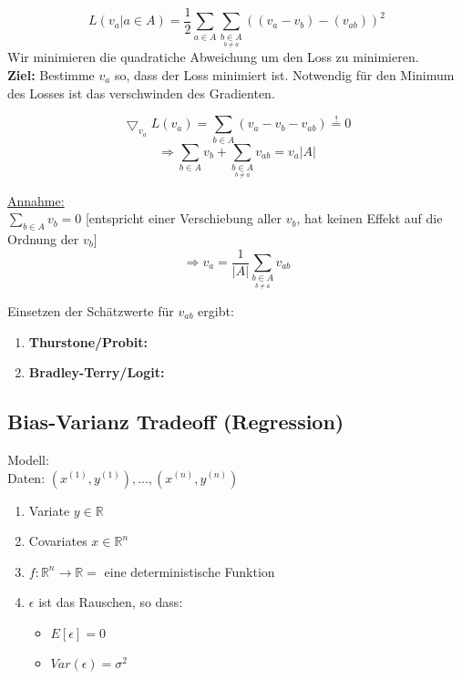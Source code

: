 $$L(v_a | a \in A) = \dfrac{1}{2} \sum_{a \in A}\sum_{\underset{b \neq a}{b \in A}}((v_a - v_b)-(v_{ab}))^2$$
Wir minimieren die quadratiche Abweichung um den Loss zu minimieren.\\
\textbf{Ziel:} Bestimme $v_a$ so, dass der Loss minimiert ist. Notwendig für den Minimum des Losses ist das verschwinden des Gradienten.

$$\bigtriangledown_{v_a}L(v_a) =  \sum_{b \in A}(v_a - v_b - v_{ab}) \overset{!}{=} 0$$
$$\Rightarrow  \sum_{b \in A}v_b + \sum_{\underset{b \neq a}{b \in A}}v_{ab} = v_a |A|$$

\underline{Annahme:} \\$ \sum_{b \in A}v_b = 0$ [entspricht einer Verschiebung aller $v_b$, hat keinen Effekt auf die Ordnung der $v_b$]\\
$$\Rightarrow v_a = \dfrac{1}{|A|} \sum_{\underset{b \neq a}{b \in A}} v_{ab}$$

Einsetzen der Schätzwerte für $v_{ab}$ ergibt:
\begin{enumerate}
\item \textbf{Thurstone/Probit:}\\



\item \textbf{Bradley-Terry/Logit:}\\


\end{enumerate}

\subsection{Bias-Varianz Tradeoff (Regression)}
Modell: \\
Daten: $(x^{(1)},y^{(1)}),...,(x^{(n)},y^{(n)})$\\
\begin{enumerate}
\item Variate   $y \in \mathbb{R}$
\item Covariates    $x \in \mathbb{R}^n$
\item $f: \mathbb{R}^n \rightarrow \mathbb{R} =$ eine deterministische Funktion
\item $\epsilon$ ist das Rauschen, so dass:
\begin{itemize}
\item $E[\epsilon] = 0$
\item $Var(\epsilon) = \sigma^2$
\end{itemize}
\end{enumerate}

